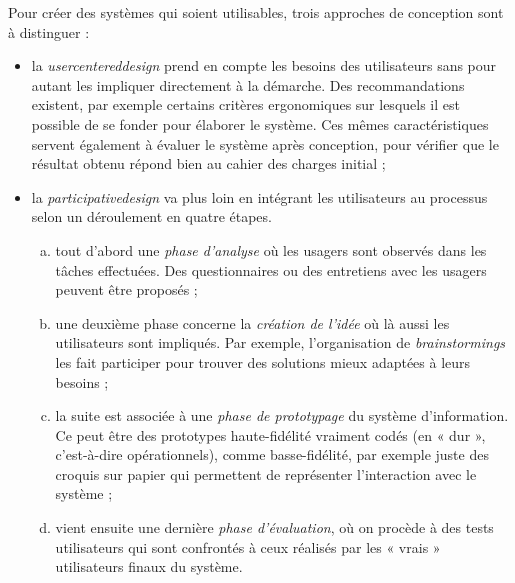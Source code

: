 Pour créer des systèmes qui soient utilisables, trois approches de conception sont à distinguer : 
\begin{itemize}
	\item la \emph{\gls{usercentereddesign}} prend en compte les besoins des utilisateurs sans pour autant les impliquer directement à la démarche. Des recommandations existent, par exemple certains critères ergonomiques sur lesquels il est possible de se fonder pour élaborer le système. Ces mêmes caractéristiques servent également à évaluer le système après conception, pour vérifier que le résultat obtenu répond bien au cahier des charges initial ;
	\item la \emph{\gls{participativedesign}} va plus loin en intégrant les utilisateurs au processus selon un déroulement en quatre étapes.
	\begin{enumerate}[a.]
		\item tout d'abord une \emph{phase d'analyse} où les usagers sont observés dans les tâches effectuées. Des questionnaires ou des entretiens avec les usagers peuvent être proposés ;
		\item une deuxième phase concerne la \emph{création de l'idée} où là aussi les utilisateurs sont impliqués. Par exemple, l'organisation de \textit{brainstormings} les fait participer pour trouver des solutions mieux adaptées à leurs besoins ;
		\item la suite est associée à une \emph{phase de prototypage} du système d'information. Ce peut être des prototypes haute-fidélité vraiment codés (en « dur », c'est-à-dire opérationnels), comme basse-fidélité, par exemple juste des croquis sur papier qui permettent de représenter l'interaction avec le système ;
		\item vient ensuite une dernière \emph{phase d'évaluation}, où on procède à des tests utilisateurs qui sont confrontés à ceux réalisés par les « vrais » utilisateurs finaux du système.
	\end{enumerate}
\begin{marginfigure}
	\newlength{\ihmwidth}
	\setlength{\ihmwidth}{\marginparwidth-1.6pt}
	\def\ihmindex{4}
	\begin{tikzpicture}[scale=1.0, inner sep=0pt, outer sep=0pt]

\end{tikzpicture}
\end{marginfigure}
\end{itemize}
